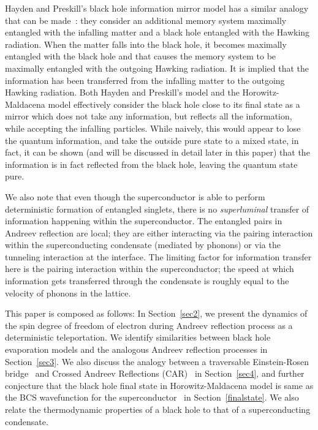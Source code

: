 \documentclass[12pt,letterpaper,aps,onecolumn,superscriptaddress,floatfix,notitlepage]{revtex4-1}
\begin{document}
	Hayden and Preskill's black hole information mirror model has a similar analogy that can be made~\cite{preskill}: they consider an additional memory system maximally entangled with the infalling matter and a black hole entangled with the Hawking radiation. When the matter falls into the black hole, it becomes maximally entangled with the black hole and that causes the memory system to be maximally entangled with the outgoing Hawking radiation. It is implied that the information has been transferred from the infalling matter to the outgoing Hawking radiation. Both Hayden and Preskill's model and the Horowitz-Maldacena model effectively consider the black hole close to its final state as a mirror which does not take any information, but reflects all the information, while accepting the infalling particles. While naively, this would appear to lose the quantum information, and take the outside pure state to a mixed state, in fact, it can be shown (and will be discussed in detail later in this paper) that the information is in fact reflected from the black hole, leaving the quantum state pure.
	
	We also note that even though the superconductor is able to perform deterministic formation of entangled singlets, there is no \textit{superluminal} transfer of information happening within the superconductor. The entangled pairs in Andreev reflection are local; they are either interacting via the pairing interaction within the superconducting condensate (mediated by phonons) or via the tunneling interaction at the interface. The limiting factor for information transfer here is the pairing interaction within the superconductor; the speed at which information gets transferred through the condensate is roughly equal to the velocity of phonons in the lattice.   
	
	This paper is composed as follows: In Section~\ref{sec2}, we present the dynamics of the spin degree of freedom of electron during Andreev reflection process as a deterministic teleportation. We identify similarities between black hole evaporation models and the analogous Andreev reflection processes in Section~\ref{sec3}. We also discuss the analogy between a traversable Einstein-Rosen bridge~\cite{wormhole} and Crossed Andreev Reflections (CAR)~\cite{car} in Section~\ref{sec4}, and further conjecture that the black hole final state in Horowitz-Maldacena model is same as the BCS wavefunction for the superconductor~\cite{BCS} in Section~\ref{finalstate}. We also relate the thermodynamic properties of a black hole to that of a superconducting condensate.
\end{document}
